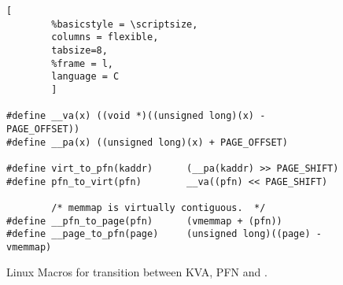
\begin{figure*}[t]
                \begin{lstlisting}[
        %basicstyle = \scriptsize,
        columns = flexible,
        tabsize=8,
        %frame = l,
        language = C
        ]
        
#define __va(x) ((void *)((unsigned long)(x) - PAGE_OFFSET))
#define __pa(x) ((unsigned long)(x) + PAGE_OFFSET)

#define virt_to_pfn(kaddr)      (__pa(kaddr) >> PAGE_SHIFT)
#define pfn_to_virt(pfn)        __va((pfn) << PAGE_SHIFT)

        /* memmap is virtually contiguous.  */
#define __pfn_to_page(pfn)      (vmemmap + (pfn))  
#define __page_to_pfn(page)     (unsigned long)((page) - vmemmap)
                \end{lstlisting}
        \caption{ Linux Macros for transition between KVA, PFN and \page.
                }
        \label{fig:mem_model}
\end{figure*}
